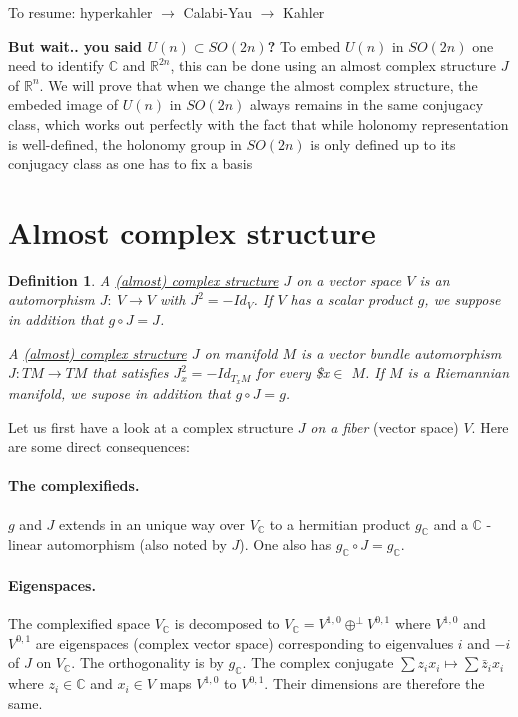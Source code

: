 \documentclass[11pt]{article}
\newtheorem{definition}{Definition}
\begin{document}
To resume: hyperkahler \(\longrightarrow\) Calabi-Yau \(\longrightarrow\) Kahler

\textbf{But wait.. you said \(U(n)\subset SO(2n)\)?} To embed \(U(n)\) in \(SO(2n)\) one need to identify \(\mathbb{C}\) and \(\mathbb{R}^{2n}\), this can be done using an almost complex structure \(J\) of \(\mathbb{R}^n\). We will prove that when we change the almost complex structure, the embeded image of
\(U(n)\) in \(SO(2n)\) always remains in the same conjugacy class, which works out perfectly with the
fact that while holonomy representation is well-defined, the holonomy group in \(SO(2n)\) is only
defined up to its conjugacy class as one has to fix a basis

\section*{Almost complex structure}
\label{sec:orgecafdec}
\begin{definition}
A \uline{(almost) complex structure} \(J\) on a vector space \(V\) is an automorphism \(J:\ V\longrightarrow V\)
with \(J^2 = -Id_V\). If \(V\) has a scalar product \(g\), we suppose in addition that \(g\circ J = J\).

A \uline{(almost) complex structure} \(J\) on manifold \(M\) is a vector bundle automorphism \(J: TM\longrightarrow
TM\) that satisfies \(J_x^2 = -Id_{T_xM}\) for every \$x\(\in\) \(M\). If \(M\) is a Riemannian manifold, we
supose in addition that \(g\circ J = g\).
\end{definition}

Let us first have a look at a complex structure \(J\) \emph{on a fiber} (vector space) \(V\). Here are some
direct consequences:
\paragraph*{The complexifieds.}
\label{sec:orgdccda4c}
\(g\) and \(J\) extends in an unique way over \(V_{ \mathbb{C}}\) to a
hermitian product \(g_{\mathbb{C}}\) and a \(\mathbb{C}\) -linear automorphism (also noted by \(J\)). One
also has \(g_{\mathbb{C}}\circ J = g_{\mathbb{C}}\).

\paragraph*{Eigenspaces.}
\label{sec:orga0fb89c}
The complexified space \(V_{ \mathbb{C}}\) is decomposed to \(V_{\mathbb{C}} =
V^{1,0} \oplus^\perp V^{0,1}\) where \(V^{1,0}\) and \(V^{0,1}\) are eigenspaces (complex vector space)
corresponding to eigenvalues \(i\) and \(-i\) of \(J\) on \(V_{\mathbb{C}}\). The orthogonality is by
\(g_{\mathbb{C}}\). The complex conjugate \(\sum z_i x_i \mapsto \sum \bar z_i x_i\) where \(z_i\in
\mathbb{C}\) and \(x_i\in V\) maps \(V^{1,0}\) to \(V^{0,1}\). Their dimensions are therefore the same.
\end{document}
